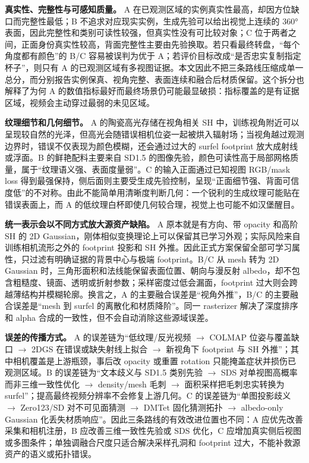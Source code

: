 \documentclass[letterpaper,times,10pt,twocolumn]{article}
\begin{document}
\textbf{真实性、完整性与可感知质量。}
A 在已观测区域的实例真实性最高，却因方位缺口而完整性最低；B 不追求对应现实实例，生成先验可以给出视觉上连续的 360° 表面，因此完整性和类别可读性较强，但真实性没有可比较对象；C 位于两者之间，正面身份真实性较高，背面完整性主要由先验换取。若只看最终转盘，“每个角度都有颜色”的 B/C 容易被误判为优于 A；若评价目标改成“是否忠实复制指定杯子”，则只有 A 的已观测区域有多视图证据。本文因此不把三条路线压缩成单一总分，而分别报告实例保真、视角完整、表面连续和融合后材质保留。这个拆分也解释了为何 A 的数值指标最好而最终场景仍可能最显破损：指标覆盖的是有证据区域，视频会主动穿过最弱的未见区域。

\textbf{纹理细节和几何细节。}
A 的陶瓷高光存储在视角相关 SH 中，训练视角附近可以呈现较自然的光泽，但高光会随错误相机位姿一起被烘入辐射场；当视角越过观测边界时，错误不仅表现为颜色模糊，还会通过过大的 surfel footprint 放大成射线或浮面。B 的鲜艳配料主要来自 SD1.5 的图像先验，颜色可读性高于局部网格质量，属于“纹理语义强、表面度量弱”。C 的输入正面通过已知视图 RGB/mask loss 得到最强保持，侧后面则主要受生成先验控制，呈现“正面细节强、背面可信度低”的不对称。由此不能简单用清晰度判断几何：一个锐利的生成纹理可能贴在错误表面上，而 A 的低纹理白杯即使几何较合理，视觉上也可能不如汉堡醒目。

\textbf{统一表示会以不同方式放大源资产缺陷。}
A 原本就是有方向、带 opacity 和高阶 SH 的 2D Gaussian，刚体相似变换理论上可以保留其已学习外观；实际风险来自训练相机流形之外的 footprint 投影和 SH 外推。因此正式方案保留全部可学习属性，只过滤有明确证据的背景中心与极端 footprint。B/C 从 mesh 转为 2D Gaussian 时，三角形面积和法线能保留表面位置、朝向与漫反射 albedo，却不包含粗糙度、镜面、透明或折射参数；采样密度过低会漏面，footprint 过大则会跨越薄结构并模糊轮廓。换言之，A 的主要融合误差是“视角外推”，B/C 的主要融合误差是“mesh 到 surfel 的离散化和材质降阶”。同一 rasterizer 解决了深度排序和 alpha 合成的一致性，但不会自动消除这些源域误差。

\textbf{误差的传播方式。}
A 的误差链为“低纹理/反光视频 $\rightarrow$ COLMAP 位姿与覆盖缺口 $\rightarrow$ 2DGS 在错误或缺失射线上拟合 $\rightarrow$ 新视角下 footprint 与 SH 外推”；其中相机覆盖是上游瓶颈，事后改 opacity 或重置 rotation 只能掩盖症状并损伤已观测区域。B 的误差链为“文本歧义与 SD1.5 类别先验 $\rightarrow$ SDS 对单视图高概率而非三维一致性优化 $\rightarrow$ density/mesh 毛刺 $\rightarrow$ 面积采样把毛刺忠实转换为 surfel”；提高最终视频分辨率不会修复上游几何。C 的误差链为“单图投影歧义 $\rightarrow$ Zero123/SD 对不可见面猜测 $\rightarrow$ DMTet 固化猜测拓扑 $\rightarrow$ albedo-only Gaussian 化丢失材质响应”。因此三条路线的有效改进位置也不同：A 应优先改善采集和相机注册，B 应改善三维一致性先验或 SDS 优化，C 应增加真实侧后视图或多图条件；单独调融合尺度只适合解决采样孔洞和 footprint 过大，不能补救源资产的语义或拓扑错误。
\end{document}
